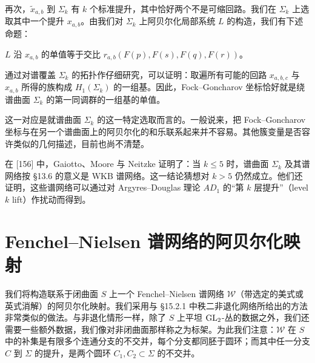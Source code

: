 再次，$\tilde{x}_{a,b}$ 到 $\Sigma_k$ 有 $k$ 个标准提升，其中恰好两个不是可缩回路。我们在 $\Sigma_k$ 上选取其中一个提升 $x_{a,b}$。由我们对 $\Sigma_k$ 上阿贝尔化局部系统 $L$ 的构造，我们有下述命题：


\begin{proposition}[15.4]
$L$ 沿 $x_{a,b}$ 的单值等于交比 $r_{a,b}(F(p),F(s),F(q),F(r))$。
\end{proposition}

通过对谱覆盖 $\Sigma_k$ 的拓扑作仔细研究，可以证明：取遍所有可能的回路 $x_{a,b,c}$ 与 $x_{a,b}$ 所得的族构成 $H_1(\Sigma_k)$ 的一组基。因此，Fock–Goncharov 坐标恰好就是绕谱曲面 $\Sigma_k$ 的第一同调群的一组基的单值。

\begin{remark}[15.5]
这一对应是就谱曲面 $\Sigma_k$ 的这一特定选取而言的。一般说来，把 Fock–Goncharov 坐标与在另一个谱曲面上的阿贝尔化的和乐联系起来并不容易。其他簇变量是否容许类似的几何描述，目前也尚不清楚。
\end{remark}

\begin{remark}[15.6]
在 [156] 中，Gaiotto、Moore 与 Neitzke 证明了：当 $k\le5$ 时，谱曲面 $\Sigma_k$ 及其谱网络按 §13.6 的意义是 WKB 谱网络。这一结论猜想对 $k>5$ 仍然成立。他们还证明，这些谱网络可以通过对 Argyres–Douglas 理论 $AD_1$ 的“第 $k$ 层提升”（level $k$ lift）作扰动而得到。
\end{remark}

\section{Fenchel–Nielsen 谱网络的阿贝尔化映射}

我们将构造联系于闭曲面 $S$ 上一个 Fenchel–Nielsen 谱网络 $\mathcal{W}$（带选定的美式或英式消解）的阿贝尔化映射。我们采用与 §15.2.1 中秩二非退化网络所给出的方法非常类似的做法。与非退化情形一样，除了 $S$ 上平坦 $\operatorname{GL}_2$-丛的数据之外，我们还需要一些额外数据，我们像对非闭曲面那样称之为标架。为此我们注意：$\mathcal{W}$ 在 $S$ 中的补集是有限多个连通分支的不交并，每个分支都同胚于圆环；而其中任一分支 $C$ 到 $\Sigma$ 的提升，是两个圆环 $C_1,C_2\subset\Sigma$ 的不交并。

